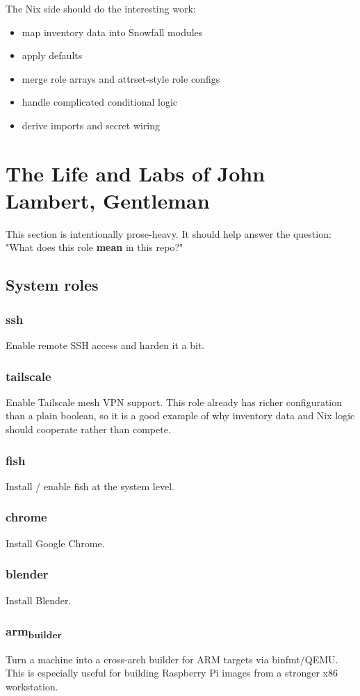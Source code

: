 \documentclass[11pt]{article}
\begin{document}
The Nix side should do the interesting work:
\begin{itemize}
\item map inventory data into Snowfall modules
\item apply defaults
\item merge role arrays and attrset-style role configs
\item handle complicated conditional logic
\item derive imports and secret wiring
\end{itemize}
\section{The Life and Labs of John Lambert, Gentleman}
\label{sec:org9e59b1c}

This section is intentionally prose-heavy. It should help answer the question:
"What does this role \textbf{mean} in this repo?"
\subsection{System roles}
\label{sec:org4615a10}

\subsubsection{ssh}
\label{sec:org74299e3}
Enable remote SSH access and harden it a bit.
\subsubsection{tailscale}
\label{sec:orgda5c59a}
Enable Tailscale mesh VPN support. This role already has richer configuration
than a plain boolean, so it is a good example of why inventory data and Nix
logic should cooperate rather than compete.
\subsubsection{fish}
\label{sec:org2cf3f63}
Install / enable fish at the system level.
\subsubsection{chrome}
\label{sec:orgca69cec}
Install Google Chrome.
\subsubsection{blender}
\label{sec:orgb513a98}
Install Blender.
\subsubsection{arm\textsubscript{builder}}
\label{sec:org5e0a6c6}
Turn a machine into a cross-arch builder for ARM targets via binfmt/QEMU.
This is especially useful for building Raspberry Pi images from a stronger x86
workstation.
\end{document}
